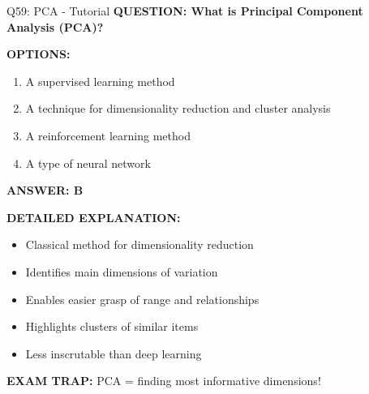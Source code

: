 \documentclass[8pt]{beamer}
\begin{document}
	\begin{frame}{Q59: PCA - Tutorial}
		\fontsize{6.5}{7.5}\selectfont
		\textbf{QUESTION: What is Principal Component Analysis (PCA)?}
		
		\vspace{0.1cm}
		\textbf{OPTIONS:}
		\begin{enumerate}
			\item A supervised learning method
			\item A technique for dimensionality reduction and cluster analysis
			\item A reinforcement learning method
			\item A type of neural network
		\end{enumerate}
		
		\vspace{0.1cm}
		\textcolor{myblue}{\textbf{ANSWER: B}}
		
		\vspace{0.1cm}
		\textbf{DETAILED EXPLANATION:}
		\begin{itemize}
			\item Classical method for dimensionality reduction
			\item Identifies main dimensions of variation
			\item Enables easier grasp of range and relationships
			\item Highlights clusters of similar items
			\item Less inscrutable than deep learning
		\end{itemize}
		
		\vspace{0.1cm}
		\textcolor{myred}{\textbf{EXAM TRAP:}} PCA = \textcolor{myblue}{finding most informative dimensions}!
	\end{frame}
	
\end{document}
